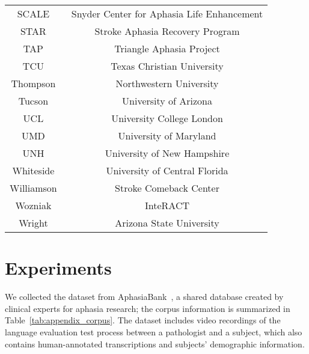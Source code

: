 \begin{table}[t]
{\begin{tabular}{c|c}
SCALE~\cite{scale2013apha}                      & Snyder Center for Aphasia Life Enhancement \\
STAR~\cite{star2013apha}                        & Stroke Aphasia Recovery Program            \\
TAP~\cite{tap2013apha}                          & Triangle Aphasia Project                   \\
TCU~\cite{tcu2013apha}                          & Texas Christian University                 \\
Thompson~\cite{thompson2013apha}                & Northwestern University                    \\
Tucson~\cite{tucson2013apha}                    & University of Arizona                      \\
UCL~\cite{ucl2021apha}                          & University College London                  \\
UMD~\cite{faroqi2018comparison}                 & University of Maryland                     \\
UNH~\cite{unh2013apha}                          & University of New Hampshire                \\
Whiteside~\cite{whiteside2013apha}              & University of Central Florida              \\
Williamson~\cite{williamson2013apha}            & Stroke Comeback Center                     \\
Wozniak~\cite{wozniak2013apha}                  & InteRACT                                   \\
Wright~\cite{wright2013apha}                    & Arizona State University                   \\ \hline
\end{tabular}%
}
\end{table}

\section{Experiments}
We collected the dataset from AphasiaBank~\cite{macwhinney2011aphasiabank, forbes2012aphasiabank}, a shared database created by clinical experts for aphasia research; the corpus information is summarized in Table~\ref{tab:appendix_corpus}. The dataset includes video recordings of the language evaluation test process between a pathologist and a subject, which also contains human-annotated transcriptions and subjects' demographic information. 


